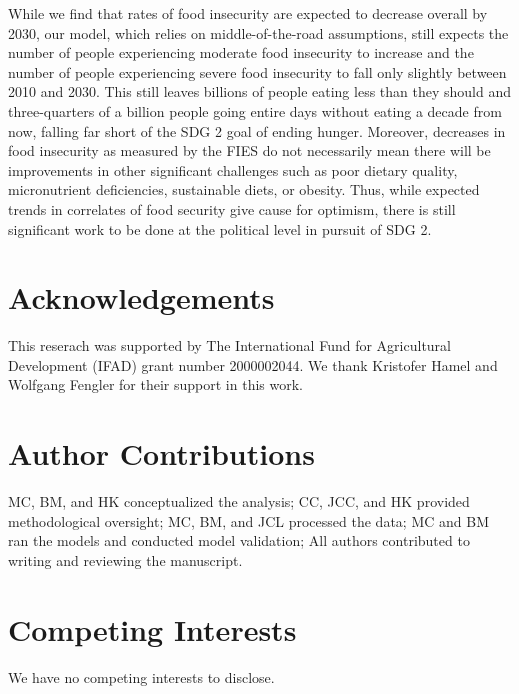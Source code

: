 \documentclass[titlepage]{article}
\begin{document}
While we find that rates of food insecurity are expected to decrease overall by 2030, our model, which relies on middle-of-the-road assumptions, still expects the number of people experiencing moderate food insecurity to increase and the number of people experiencing severe food insecurity to fall only slightly between 2010 and 2030.  This still leaves billions of people eating less than they should and three-quarters of a billion people going entire days without eating a decade from now, falling far short of the SDG 2 goal of ending hunger.  Moreover, decreases in food insecurity as measured by the FIES do not necessarily mean there will be improvements in other significant challenges such as poor dietary quality, micronutrient deficiencies, sustainable diets, or obesity.  Thus, while expected trends in correlates of food security give cause for optimism, there is still significant work to be done at the political level in pursuit of SDG 2.

\section{Acknowledgements}
This reserach was supported by The International Fund for Agricultural Development (IFAD) grant number 2000002044.  We thank Kristofer Hamel and Wolfgang Fengler for their support in this work.

\section{Author Contributions}
MC, BM, and HK conceptualized the analysis; CC, JCC, and HK provided methodological oversight; MC, BM, and JCL processed the data; MC and BM ran the models and conducted model validation; All authors contributed to writing and reviewing the manuscript.

\section{Competing Interests}
We have no competing interests to disclose.

\printbibliography
\end{document}
